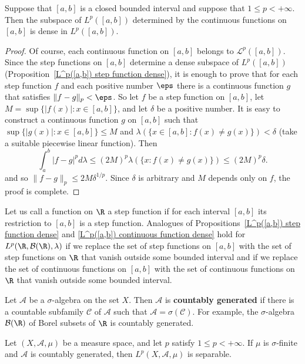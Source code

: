 \begin{proposition}\label{L^p([a,b]) continuous function dense}
Suppose that $[a,b]$ is a closed bounded interval and suppose that $1\leq p<+\infty$. Then the subspace of $L^p([a,b])$ determined by the continuous functions on $[a,b]$ is dense in $L^p([a,b])$.
\end{proposition}
\begin{proof}
Of course, each continuous function on $[a,b]$ belongs to $\mathcal{L}^p([a,b])$. Since the step functions on $[a,b]$ determine a dense subspace of $L^p([a,b])$ (Proposition~\ref{L^p([a,b]) step function dense}), it is enough to prove that for each step function $f$ and each positive number $\eps$ there is a continuous function $g$ that satisfies $\|f-g\|_p<\eps$. So let $f$ be a step function on $[a,b]$, let $M=\sup\{|f(x)|:x\in [a,b]\}$, and let $\delta$ be a positive number. It is easy to construct a continuous function $g$ on $[a,b]$ such that $\sup\{|g(x)|:x\in [a,b]\}\leq M$ and $\lambda(\{x\in[a,b]:f(x)\neq g(x)\})<\delta$ (take a suitable piecewise linear function). Then
\[\int_a^b|f-g|^pd\lambda\leq(2M)^p\lambda(\{x:f(x)\neq g(x)\})\leq(2M)^p\delta.\]
and so $\|f-g\|_p\leq 2M\delta^{1/p}$. Since $\delta$ is arbitrary and $M$ depends only on $f$, the proof is complete.
\end{proof}
Let us call a function on $\R$ a step function if for each interval $[a,b]$ its restriction to $[a,b]$ is a step function. Analogues of Propositions~\ref{L^p([a,b]) step function dense} and \ref{L^p([a,b]) continuous function dense} hold for $L^p(\R,\mathcal{B}(\R),\lambda)$ if we replace the set of step functions on $[a,b]$ with the set of step functions on $\R$ that vanish outside some bounded interval and if we replace the set of continuous functions on $[a,b]$ with the set of continuous functions on $\R$ that vanish outside some bounded interval.\par
Let $\mathcal{A}$ be a $\sigma$-algebra on the set $X$. Then $\mathcal{A}$ is \textbf{countably generated} if there is a countable subfamily $\mathcal{C}$ of $\mathcal{A}$ such that $\mathcal{A}=\sigma(\mathcal{C})$. For example, the $\sigma$-algebra $\mathcal{B}(\R)$ of Borel subsets of $\R$ is countably generated.
\begin{proposition}\label{L^p separable if}
Let $(X,\mathcal{A},\mu)$ be a measure space, and let $p$ satisfy $1\leq p<+\infty$. If $\mu$ is $\sigma$-finite and $\mathcal{A}$ is countably generated, then $L^p(X,\mathcal{A},\mu)$ is separable.
\end{proposition}
